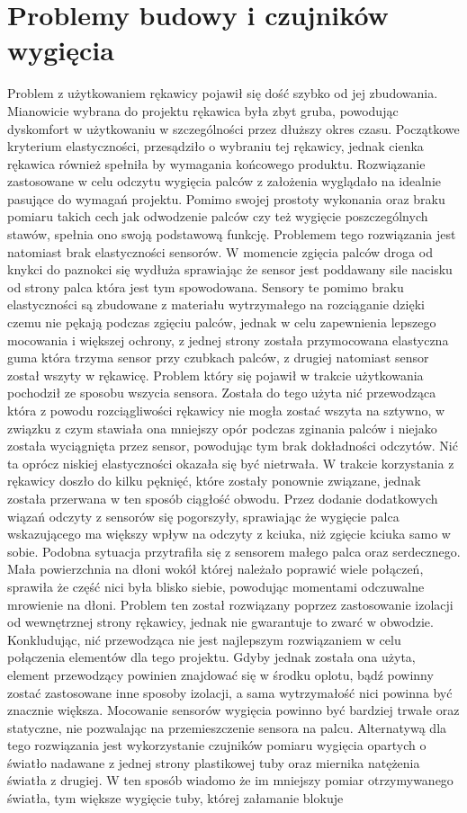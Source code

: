 \section{Problemy budowy i czujników wygięcia}
 \label{sec:iuPalce}
 Problem z użytkowaniem rękawicy pojawił się dość szybko od jej zbudowania. Mianowicie wybrana do projektu rękawica była zbyt gruba, powodując dyskomfort w użytkowaniu w szczególności przez dłuższy okres czasu. Początkowe kryterium elastyczności, przesądziło o wybraniu tej rękawicy, jednak cienka rękawica również spełniła by wymagania końcowego produktu. Rozwiązanie zastosowane w celu odczytu wygięcia palców z założenia wyglądało na idealnie pasujące do wymagań projektu. Pomimo swojej prostoty wykonania oraz braku pomiaru takich cech jak odwodzenie palców czy też wygięcie poszczególnych stawów, spełnia ono swoją podstawową funkcję. Problemem tego rozwiązania jest natomiast brak elastyczności sensorów. W momencie zgięcia palców droga od knykci do paznokci się wydłuża sprawiając że sensor jest poddawany sile nacisku od strony palca która jest tym spowodowana. Sensory te pomimo braku elastyczności są zbudowane z materiału wytrzymałego na rozciąganie dzięki czemu nie pękają podczas zgięciu palców, jednak w celu zapewnienia lepszego mocowania i większej ochrony, z jednej strony została przymocowana elastyczna guma która trzyma sensor przy czubkach palców, z drugiej natomiast sensor został wszyty w rękawicę. Problem który się pojawił w trakcie użytkowania pochodził ze sposobu wszycia sensora. Została do tego użyta nić przewodząca która z powodu rozciągliwości rękawicy nie mogła zostać wszyta na sztywno, w związku z czym stawiała ona mniejszy opór podczas zginania palców i niejako została wyciągnięta przez sensor, powodując tym brak dokładności odczytów. Nić ta oprócz niskiej elastyczności okazała się być nietrwała. W trakcie korzystania z rękawicy doszło do kilku pęknięć, które zostały ponownie związane, jednak została przerwana w ten sposób ciągłość obwodu. Przez dodanie dodatkowych wiązań odczyty z sensorów się pogorszyły, sprawiając że wygięcie palca wskazującego ma większy wpływ na odczyty z kciuka, niż zgięcie kciuka samo w sobie. Podobna sytuacja przytrafiła się z sensorem małego palca oraz serdecznego. Mała powierzchnia na dłoni wokół której należało poprawić wiele połączeń, sprawiła że część nici była blisko siebie, powodując momentami odczuwalne mrowienie na dłoni. Problem ten został rozwiązany poprzez zastosowanie izolacji od wewnętrznej strony rękawicy, jednak nie gwarantuje to zwarć w obwodzie. Konkludując, nić przewodząca nie jest najlepszym rozwiązaniem w celu połączenia elementów dla tego projektu. Gdyby jednak została ona użyta, element przewodzący powinien znajdować się w środku oplotu, bądź powinny zostać zastosowane inne sposoby izolacji, a sama wytrzymałość nici powinna być znacznie większa. Mocowanie sensorów wygięcia powinno być bardziej trwałe oraz statyczne, nie pozwalając na przemieszczenie sensora na palcu. Alternatywą dla tego rozwiązania jest wykorzystanie czujników pomiaru wygięcia opartych o światło nadawane z jednej strony plastikowej tuby oraz miernika natężenia światła z drugiej. W ten sposób wiadomo że im mniejszy pomiar otrzymywanego światła, tym większe wygięcie tuby, której załamanie blokuje 